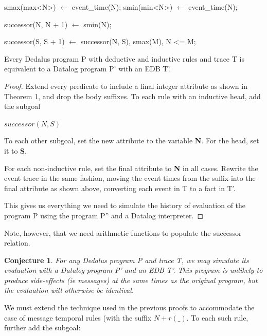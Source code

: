 \begin{Dedalus}
smax(max<N>) \(\leftarrow\) event\_time(N);
smin(min<N>) \(\leftarrow\) event\_time(N);

successor(N, N + 1) \(\leftarrow\) smin(N);

successor(S, S + 1) \(\leftarrow\) 
    successor(N, S),
    smax(M),
    N <= M;
\end{Dedalus}


\begin{theorem}
Every Dedalus program P with deductive and inductive rules and trace T is equivalent to a Datalog program P' with an EDB T'.
\end{theorem}

\begin{proof}

Extend every predicate to include a final integer attribute as shown in Theorem 1, and drop the body suffixes.  To each rule 
with an inductive head, add the subgoal 

$successor(N, S)$

To each other subgoal, set the new attribute to the variable \textbf{N}.  For the head, set it to \textbf{S}.  

For each non-inductive rule, set the final attribute to \textbf{N} in all cases.  Rewrite the event trace in the same fashion, 
moving the event times from the suffix into the final attribute as shown above, converting each event in T to a fact in T'.


This gives us everything we need to simulate the history of evaluation of the program P using the program P'' and a Datalog interpreter.

\end{proof}

Note, however, that we need arithmetic functions to populate the successor relation.

\newtheorem{conjecture}{Conjecture}
\begin{conjecture}
For any Dedalus program P and trace T, we may simulate its evaluation with a Datalog program P' and an EDB T'.  This program
is unlikely to produce side-effects (ie messages) at the same times as the original program, but the evaluation will otherwise be identical.
\end{conjecture}

We must extend the technique used in the previous proofs to accommodate the case of message temporal rules (with the suffix $N+r(\_)$.
To each such rule, further add the subgoal:

